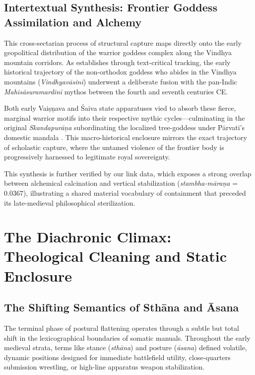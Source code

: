 \documentclass[11pt,twoside,letterpaper]{article}
\begin{document}
\subsection{Intertextual Synthesis: Frontier Goddess Assimilation and Alchemy}
This cross-sectarian process of structural capture maps directly onto the early geopolitical distribution of the warrior goddess complex along the Vindhya mountain corridors. As \citet{Yokochi1999} establishes through text-critical tracking, the early historical trajectory of the non-orthodox goddess who abides in the Vindhya mountains (\textit{Vindhyavāsinī}) underwent a deliberate fusion with the pan-Indic \textit{Mahisāsuramardinī} mythos between the fourth and seventh centuries CE. 

Both early Vaiṣṇava and Śaiva state apparatuses vied to absorb these fierce, marginal warrior motifs into their respective mythic cycles—culminating in the original \textit{Skandapurāṇa} subordinating the localized tree-goddess under Pārvatī’s domestic mandala \citep{Yokochi1999}. This macro-historical enclosure mirrors the exact trajectory of scholastic capture, where the untamed violence of the frontier body is progressively harnessed to legitimate royal sovereignty. 

This synthesis is further verified by our link data, which exposes a strong overlap between alchemical calcination and vertical stabilization (\textit{stambha-māraṇa} = $0.0367$), illustrating a shared material vocabulary of containment that preceded its late-medieval philosophical sterilization.

\section{The Diachronic Climax: Theological Cleaning and Static Enclosure}

\subsection{The Shifting Semantics of Sthāna and Āsana}
The terminal phase of postural flattening operates through a subtle but total shift in the lexicographical boundaries of somatic manuals. Throughout the early medieval strata, terms like stance (\textit{sthāna}) and posture (\textit{āsana}) defined volatile, dynamic positions designed for immediate battlefield utility, close-quarters submission wrestling, or high-line apparatus weapon stabilization. 
\end{document}
